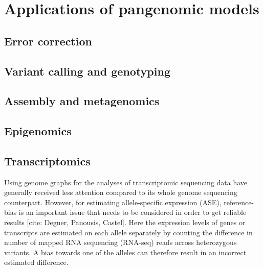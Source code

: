 \section{Applications of pangenomic models}

\subsection{Error correction}

\subsection{Variant calling and genotyping}

\subsection{Assembly and metagenomics}

\subsection{Epigenomics}

\subsection{Transcriptomics}

Using genome graphs for the analyses of transcriptomic sequencing data have generally received less attention compared to its whole genome sequencing counterpart.
However, for estimating allele-specific expression (ASE), reference-bias is an important issue that needs to be considered in order to get reliable results [cite: Degner, Panousis, Castel].
Here the expression levels of genes or transcripts are estimated on each allele separately by counting the difference in number of mapped RNA sequencing (RNA-seq) reads across heterozygous variants.
A bias towards one of the alleles can therefore result in an incorrect estimated difference.

